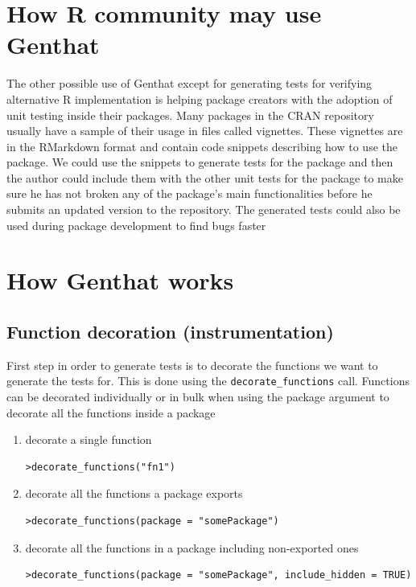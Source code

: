 \documentclass[thesis=B,english]{FITthesis}[2012/10/20]
\begin{document}
\section{How R community may use Genthat}
The other possible use of Genthat except for generating tests for verifying alternative R implementation is helping package creators with the adoption of unit testing inside their packages. Many packages in the CRAN repository usually have a sample of their usage in files called vignettes. These vignettes are in the RMarkdown format and contain code snippets describing how to use the package. We could use the snippets to generate tests for the package and then the author could include them with the other unit tests for the package to make sure he has not broken any of the package’s main functionalities before he submits an updated version to the repository. The generated tests could also be used during package development to find bugs faster 

\section{How Genthat works}
\subsection{Function decoration (instrumentation)}
First step in order to generate tests is to decorate the functions we want to generate the tests for. This is done using the \verb|decorate_functions| call. Functions can be decorated individually or in bulk when using the package argument to decorate all the functions inside a package

\begin{enumerate}
\item decorate a single function
\begin{verbatim}
>decorate_functions("fn1")
\end{verbatim}
\item decorate all the functions a package exports
\begin{verbatim}
>decorate_functions(package = "somePackage")
\end{verbatim}
\item decorate all the functions in a package including non-exported ones
\begin{verbatim}
>decorate_functions(package = "somePackage", include_hidden = TRUE)
\end{verbatim}
\end{enumerate}
\end{document}
